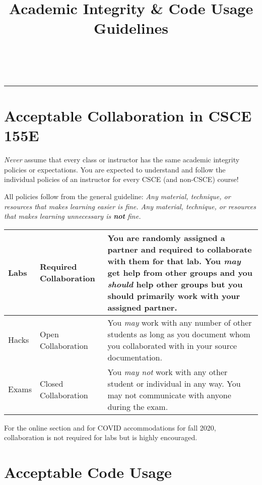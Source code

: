 \documentclass[12pt]{scrartcl}
\title{Academic Integrity \& Code Usage Guidelines}\let\Title\@title
\subtitle{Computer Science I\\
{\small
\vskip.5cm
Department of Computer Science \& Engineering \\
University of Nebraska--Lincoln}
\vskip-1cm}
\date{~}
\begin{document}
\maketitle
\vskip-1.5cm
\hrule

\section*{Acceptable Collaboration in CSCE 155E}

\emph{Never} assume that every class or instructor has the same academic 
integrity policies or expectations.  You are expected to understand and 
follow the individual policies of an instructor for every CSCE (and non-CSCE)
course!

All policies follow from the general guideline:  \emph{Any material, technique, 
or resources that makes learning easier is fine.  Any material, technique, 
or resources that makes learning unnecessary is \textbf{not} fine.}

\begin{center}
\begin{tabular}{|l|l|p{8cm}|}
\hline
Labs & Required Collaboration & You are randomly assigned a partner and required to collaborate with them for that lab.  You \emph{may} get help from other groups and
you \emph{should} help other groups but you should primarily work with your assigned partner. \\
\hline
Hacks & Open Collaboration & You \emph{may} work with any number of other students as long as you document whom you collaborated with in your source documentation.\\
\hline
Exams & Closed Collaboration & You \emph{may not} work with any other student or individual in any way.  You may not communicate with anyone during the exam.\\
\hline
\end{tabular}
\end{center}

For the online section and for COVID accommodations for fall 2020, 
collaboration is not required for labs but is highly encouraged.

\section*{Acceptable Code Usage}
\end{document}
